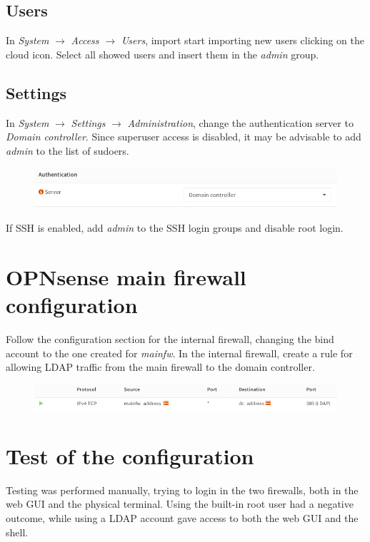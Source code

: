 \documentclass[draft]{homework}
\newcommand{\opn}{OPNsense\xspace}
\begin{document}
    \subsection{Users}
    In \textit{System} $\rightarrow$ \textit{Access} $\rightarrow$ \textit{Users}, import start importing new users clicking on the cloud icon.
    Select all showed users and insert them in the \textit{admin} group.
    
    \subsection{Settings}
    In \textit{System} $\rightarrow$ \textit{Settings} $\rightarrow$ \textit{Administration}, change the authentication server to \textit{Domain controller}.
    Since superuser access is disabled, it may be advisable to add \textit{admin} to the list of sudoers.
    \begin{figure}[H]
        \centering
        \includegraphics[width=\linewidth]{images/settings}
        \label{fig:settings}
    \end{figure}
    
    If SSH is enabled, add \textit{admin} to the SSH login groups and disable root login.
    
    
    \section{\opn main firewall configuration}
    Follow the configuration section for the internal firewall, changing the bind account to the one created for \textit{mainfw}.
    In the internal firewall, create a rule for allowing LDAP traffic from the main firewall to the domain controller.
    \begin{figure}[H]
        \centering
        \includegraphics[width=\linewidth]{images/rule}
        \label{fig:rule}
    \end{figure}
    
    
    \section{Test of the configuration}
    Testing was performed manually, trying to login in the two firewalls, both in the web GUI and the physical terminal.
    Using the built-in root user had a negative outcome, while using a LDAP account gave access to both the web GUI and the shell.
    
\end{document}
